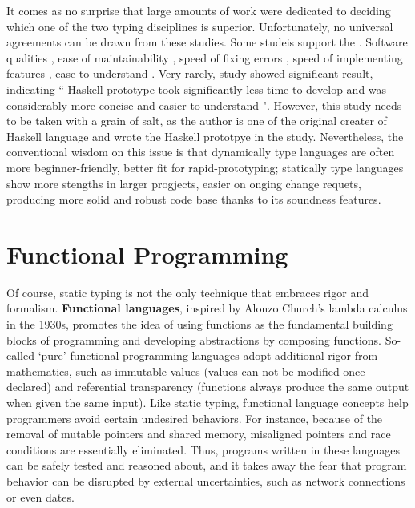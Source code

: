 It comes as no surprise that large amounts of work were dedicated to deciding which one of the two typing disciplines is superior.   Unfortunately, no universal agreements can be drawn from these studies.  Some studeis support the \cite{Ray2017-gq, Kleinschmager2012-bg, Mayer2012-qc, Gao2017-xn}.  Software qualities \cite{Ray2017-gq, Gao2017-xn}, ease of maintainability \cite{Kleinschmager2012-bg}, speed of fixing errors \cite{Prechelt1998-pd}, speed of implementing features \cite{Prechelt2000-bf, Mayer2012-qc}, ease to understand \cite{Endrikat2014-uz}. Very rarely, study \cite{Hudak1994-ex} showed significant result, indicating `` Haskell prototype took signiﬁcantly less time to develop and was
considerably more concise and easier to understand ".  However, this study needs to be taken with a grain of salt, as the author is one of the  original creater of Haskell language and wrote the Haskell prototpye in the study. Nevertheless, the conventional wisdom on this issue is that dynamically type languages are often more beginner-friendly, better fit for rapid-prototyping; statically type languages show more stengths in larger progjects, easier on onging change requets, producing more solid and robust code base thanks to its soundness features. 

\section{Functional Programming}
Of course, static typing is not the only technique that embraces rigor and formalism. \textbf{Functional languages}, inspired by Alonzo Church's lambda calculus \cite{Church1985-bx} in the 1930s, promotes the idea of using functions as the fundamental building blocks of programming and developing abstractions by composing functions. 
So-called `pure' functional programming languages adopt additional rigor from mathematics, such as immutable values (values can not be modified once declared) and referential transparency (functions always produce the same output when given the same input).  Like static typing, functional language concepts help programmers avoid certain undesired behaviors. For instance, because of the removal of mutable pointers and shared memory,  misaligned pointers and race conditions are essentially eliminated. Thus, programs written in these languages can be safely tested and reasoned about, and it takes away the fear that program behavior can be disrupted by external uncertainties, such as network connections or even dates. 

